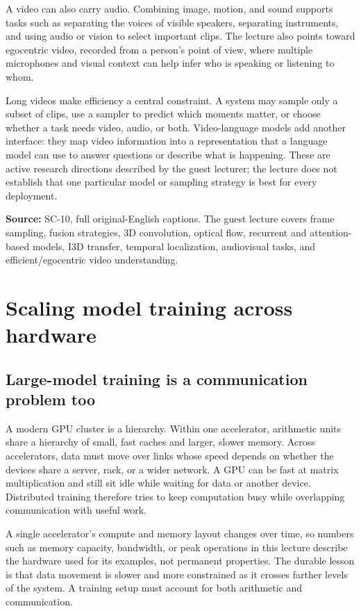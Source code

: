 A video can also carry audio. Combining image, motion, and sound supports tasks such as separating the voices of visible speakers, separating instruments, and using audio or vision to select important clips. The lecture also points toward egocentric video, recorded from a person's point of view, where multiple microphones and visual context can help infer who is speaking or listening to whom.

Long videos make efficiency a central constraint. A system may sample only a subset of clips, use a sampler to predict which moments matter, or choose whether a task needs video, audio, or both. Video-language models add another interface: they map video information into a representation that a language model can use to answer questions or describe what is happening. These are active research directions described by the guest lecturer; the lecture does not establish that one particular model or sampling strategy is best for every deployment.

\textbf{Source:} SC-10, full original-English captions. The guest lecture covers frame sampling, fusion strategies, 3D convolution, optical flow, recurrent and attention-based models, I3D transfer, temporal localization, audiovisual tasks, and efficient/egocentric video understanding.

\section{Scaling model training across hardware}\label{04-visual-computing-ii-ch031-scaling-model-training-across-hardware}

\subsection{Large-model training is a communication problem too}\label{04-visual-computing-ii-ch031-large-model-training-is-a-communication-problem-too}

A modern GPU cluster is a hierarchy. Within one accelerator, arithmetic units share a hierarchy of small, fast caches and larger, slower memory. Across accelerators, data must move over links whose speed depends on whether the devices share a server, rack, or a wider network. A GPU can be fast at matrix multiplication and still sit idle while waiting for data or another device. Distributed training therefore tries to keep computation busy while overlapping communication with useful work.

A single accelerator's compute and memory layout changes over time, so numbers such as memory capacity, bandwidth, or peak operations in this lecture describe the hardware used for its examples, not permanent properties. The durable lesson is that data movement is slower and more constrained as it crosses farther levels of the system. A training setup must account for both arithmetic and communication.

